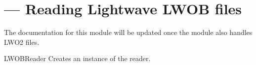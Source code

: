 \section{ ---
        Reading Lightwave LWOB files}


The documentation for this module will be updated once the module
also handles LWO2 files.

\begin{classdesc}{LWOBReader}{}
  Creates an instance of the reader.
\end{classdesc}

